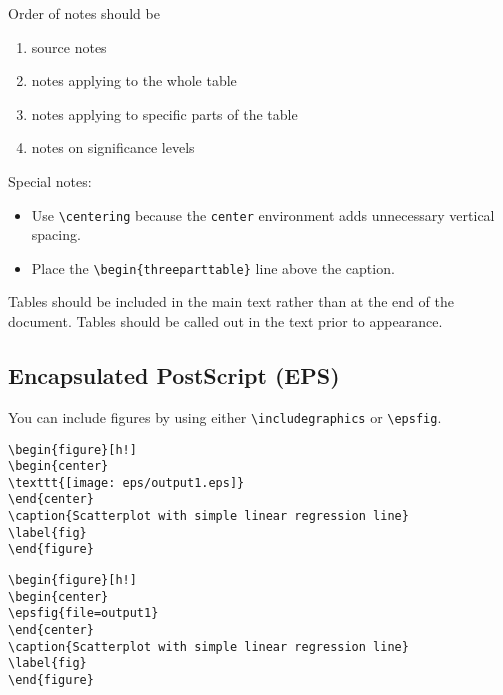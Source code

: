 Order of notes should be
\vspace{-.08in}
\begin{enumerate}
\item source notes
\item notes applying to the whole table
\item notes applying to specific parts of the table
\item notes on significance levels
\end{enumerate}

Special notes:

\vspace{-.08in}
\begin{itemize}
\item Use \verb+\centering+ because the {\tt center} environment adds
unnecessary vertical spacing.

\item Place the \verb+\begin{threeparttable}+ line above the caption.

\end{itemize}

Tables should be included in the main text rather than at the end of the
document. Tables should be called out in the text prior to appearance.

\subsection{Encapsulated PostScript (EPS)}

You can include figures by using either \verb+\includegraphics+ or
\verb+\epsfig+.

\begin{stverbatim}
\begin{verbatim}
\begin{figure}[h!]
\begin{center}
\texttt{[image: eps/output1.eps]}
\end{center}
\caption{Scatterplot with simple linear regression line}
\label{fig}
\end{figure}
\end{verbatim}
\end{stverbatim}

\begin{stverbatim}
\begin{verbatim}
\begin{figure}[h!]
\begin{center}
\epsfig{file=output1}
\end{center}
\caption{Scatterplot with simple linear regression line}
\label{fig}
\end{figure}
\end{verbatim}
\end{stverbatim}

